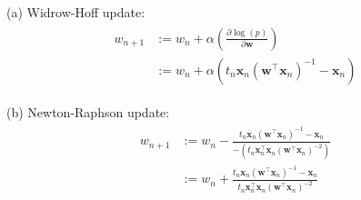 \documentclass[10pt]{article}
\begin{document}
\begin{itemize}
(a)  Widrow-Hoff update:
\begin{eqnarray*}
\begin{aligned}
w_{n+1} &:= w_n + \alpha (\frac{\partial \log(p)}{\partial \mathbf{w}})
\\
&:= w_n + \alpha (t_n \mathbf{x}_n (\mathbf{w}^\top \mathbf{x}_n)^{-1} - \mathbf{x}_n
)
\end{aligned}
\end{eqnarray*}

(b)  Newton-Raphson update:
\begin{eqnarray*}
\begin{aligned}
w_{n+1} &:= w_n - 
\frac{t_n \mathbf{x}_n (\mathbf{w}^\top \mathbf{x}_n)^{-1} - \mathbf{x}_n}
{-( t_n \mathbf{x}_n^\top \mathbf{x}_n ( \mathbf{w}^\top \mathbf{x}_n)^{-2})}
\\
&:= w_n +
\frac{t_n \mathbf{x}_n (\mathbf{w}^\top \mathbf{x}_n)^{-1} - \mathbf{x}_n}
{t_n \mathbf{x}_n^\top \mathbf{x}_n ( \mathbf{w}^\top \mathbf{x}_n)^{-2}}
\end{aligned}
\end{eqnarray*}

\end{itemize}
\end{document}
